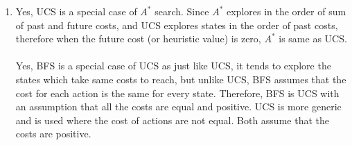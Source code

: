 \documentclass[12pt]{article}
\begin{document}
\begin{enumerate}[label=(\alph*)]
	\item Yes, UCS is a special case of $A^*$ search. Since $A^*$ explores in the order of sum of past and future costs, and UCS explores states in the order of past costs, therefore when the future cost (or heuristic value) is zero, $A^*$ is same as UCS. \\ \\
	 Yes, BFS is a special case of UCS as just like UCS, it tends to explore the states which take same costs to reach, but unlike UCS, BFS assumes that the cost for each action is the same for every state. Therefore, BFS is UCS with an assumption that all the costs are equal and positive. UCS is more generic and is used where the cost of actions are not equal. Both assume that the costs are positive.
	
	
\end{enumerate}
\end{document}
